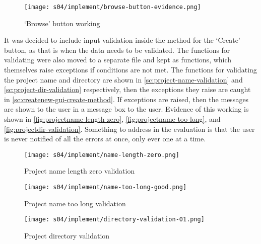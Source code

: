         \begin{figure}[!ht]
            \centering
            \texttt{[image: s04/implement/browse-button-evidence.png]}
            \caption{`Browse' button working}
            \label{fig:createnew-browse-button-working}
        \end{figure}

        It was decided to include input validation inside the method for the `Create' button, as that is when the data needs to be validated. 
        The functions for validating were also moved to a separate file and kept as functions, which themselves raise exceptions if conditions are not met.
        The functions for validating the project name and directory are shown in \autoref{sc:project-name-validation} and \autoref{sc:project-dir-validation} respectively, then the exceptions they raise are caught in \autoref{sc:createnew-gui-create-method}.
        If exceptions are raised, then the messages are shown to the user in a message box to the user. 
        Evidence of this working is shown in \autoref{fig:projectname-length-zero}, \autoref{fig:projectname-too-long}, and \autoref{fig:projectdir-validation}. 
        Something to address in the evaluation is that the user is never notified of all the errors at once, only ever one at a time. 



        \begin{figure}[!ht]
            \centering
            \texttt{[image: s04/implement/name-length-zero.png]}
            \caption{Project name length zero validation}
            \label{fig:projectname-length-zero}
        \end{figure}

        \begin{figure}[!ht]
            \centering
            \texttt{[image: s04/implement/name-too-long-good.png]}
            \caption{Project name too long validation}
            \label{fig:projectname-too-long}
        \end{figure}

        \begin{figure}[!ht]
            \centering
            \texttt{[image: s04/implement/directory-validation-01.png]}
            \caption{Project directory validation}
            \label{fig:projectdir-validation}
        \end{figure}


